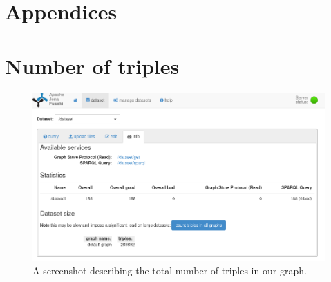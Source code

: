 \chapter*{Appendices}
\appendix

\chapter{Number of triples}
\label{appendix:triples}
\begin{figure}[H]
	\centering
	\includegraphics[width=\linewidth]{figures/triples.png}
	\caption{A screenshot describing the total number of triples in our graph.}
\end{figure}

